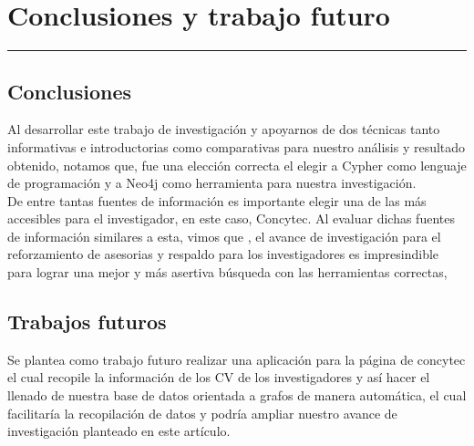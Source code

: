 \chapter{Conclusiones y trabajo futuro}
\hrule \bigskip \vspace*{1cm}

\section{Conclusiones}

Al desarrollar este trabajo de investigación y apoyarnos de dos técnicas tanto informativas e introductorias como comparativas para nuestro análisis y resultado obtenido, notamos que, fue una elección correcta el elegir a Cypher como lenguaje de programación y a Neo4j como herramienta para nuestra investigación.\\
De entre tantas fuentes de información es importante elegir una de las más accesibles para el investigador, en este caso, Concytec. Al evaluar dichas fuentes de información similares a esta, vimos que , el avance de investigación para el reforzamiento de asesorias y respaldo para los investigadores es impresindible para lograr una mejor y más asertiva búsqueda con las herramientas correctas,


\section{Trabajos futuros}
Se plantea como trabajo futuro realizar una aplicación para la página de concytec el cual recopile la información de los CV de los investigadores y así hacer el llenado de nuestra base de datos orientada a grafos de manera automática, el cual facilitaría la recopilación de datos y podría ampliar nuestro avance de investigación planteado en este artículo.


